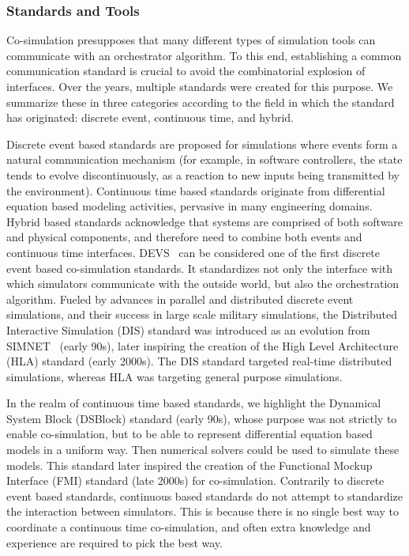 \subsubsection{Standards and Tools}

Co-simulation presupposes that many different types of simulation tools can communicate with an orchestrator algorithm. 
To this end, establishing a common communication standard is crucial to avoid the combinatorial explosion of interfaces. 
Over the years, multiple standards were created for this purpose. 
We summarize these in three categories according to the field in which the standard has originated: discrete event, continuous time, and hybrid. 

Discrete event based standards are proposed for simulations where events form a natural communication mechanism (for example, in software controllers, the state tends to evolve discontinuously, as a reaction to new inputs being transmitted by the environment).
Continuous time based standards originate from differential equation based modeling activities, pervasive in many engineering domains. 
Hybrid based standards acknowledge that systems are comprised of both software and physical components, and therefore need to combine both events and continuous time interfaces.
DEVS~\cite{Zeigler1976} can be considered one of the first discrete event based co-simulation standards. It standardizes not only the interface with which simulators communicate with the outside world, but also the orchestration algorithm. 
Fueled by advances in parallel and distributed discrete event simulations, and their success in large scale military simulations, the Distributed Interactive Simulation (DIS) \cite{IEEE2012} standard was introduced as an evolution from SIMNET~\cite{Miller1995} (early 90s), later inspiring the creation of the High Level Architecture (HLA) standard \cite{IEEE2010} (early 2000s). The DIS standard targeted real-time distributed simulations, whereas HLA was targeting general purpose simulations.

In the realm of continuous time based standards, we highlight the Dynamical System Block (DSBlock) \cite{Otter1995} standard (early 90s), whose purpose was not strictly to enable co-simulation, but to be able to represent differential equation based models in a uniform way. 
Then numerical solvers could be used to simulate these models. 
This standard later inspired the creation of the Functional Mockup Interface (FMI) standard \cite{Blochwitz2011} (late 2000s) for co-simulation. 
Contrarily to discrete event based standards, continuous based standards do not attempt to standardize the interaction between simulators. 
This is because there is no single best way to coordinate a continuous time co-simulation, and often extra knowledge and experience are required to pick the best way.

